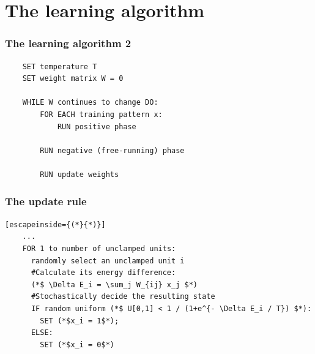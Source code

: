 \documentclass[14pt,aspectratio=169]{beamer}
\theoremstyle{remark}
\begin{document}
\section{The learning algorithm}

\begin{frame}[fragile]
    \frametitle{The learning algorithm 2}
    \begin{lstlisting}
    SET temperature T
    SET weight matrix W = 0

    WHILE W continues to change DO:
        FOR EACH training pattern x:
            RUN positive phase

        RUN negative (free-running) phase

        RUN update weights
    \end{lstlisting}
\end{frame}

\begin{frame}[fragile]
    \frametitle{The update rule}
    \begin{lstlisting}[escapeinside={(*}{*)}]
    ...
    FOR 1 to number of unclamped units:
      randomly select an unclamped unit i
      #Calculate its energy difference: 
      (*$ \Delta E_i = \sum_j W_{ij} x_j $*)
      #Stochastically decide the resulting state
      IF random uniform (*$ U[0,1] < 1 / (1+e^{- \Delta E_i / T}) $*):
        SET (*$x_i = 1$*); 
      ELSE: 
        SET (*$x_i = 0$*)
    \end{lstlisting}
\end{frame}
\end{document}
